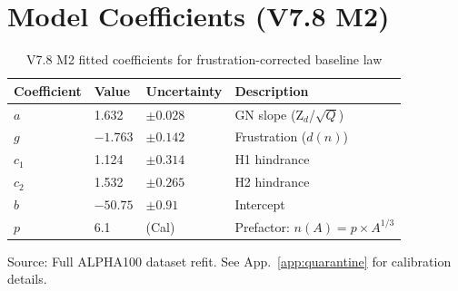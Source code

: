 \section{Model Coefficients (V7.8 M2)}
\label{sec:tables:coefficients}

\begin{table}[htbp]
\centering
\caption{V7.8 M2 fitted coefficients for frustration-corrected baseline law}
\label{tab:v78_coefficients}
\begin{tabular}{llll}
    \toprule
    Coefficient & Value & Uncertainty & Description \\
    \midrule
    $a$ & 1.632 & $\pm 0.028$ & GN slope (Z$_d$/$\sqrt{Q}$) \\
    $g$ & $-1.763$ & $\pm 0.142$ & Frustration ($d(n)$) \\
    $c_1$ & 1.124 & $\pm 0.314$ & H1 hindrance \\
    $c_2$ & 1.532 & $\pm 0.265$ & H2 hindrance \\
    $b$ & $-50.75$ & $\pm 0.91$ & Intercept \\
    \midrule
    $p$ & 6.1 & (Cal) & Prefactor: $n(A) = p \times A^{1/3}$ \\
    \bottomrule
\end{tabular}

\vspace{2mm}
\footnotesize
Source: Full ALPHA100 dataset refit. See App.~\ref{app:quarantine} for calibration details.
\end{table}

